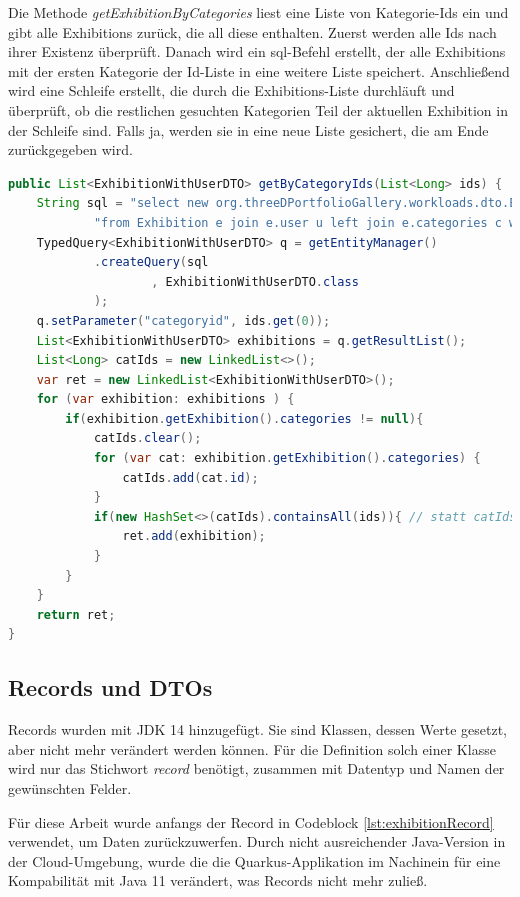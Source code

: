 Die Methode \emph{getExhibitionByCategories} liest eine Liste von Kategorie-Ids ein und gibt alle Exhibitions zurück, die all diese enthalten. 
Zuerst werden alle Ids nach ihrer Existenz überprüft. 
Danach wird ein \gls{sql}-Befehl erstellt, der alle Exhibitions mit der ersten Kategorie der Id-Liste in eine weitere Liste speichert. 
Anschließend wird eine Schleife erstellt, die durch die Exhibitions-Liste durchläuft und überprüft, ob die restlichen gesuchten Kategorien Teil der aktuellen Exhibition in der Schleife sind. 
Falls ja, werden sie in eine neue Liste gesichert, die am Ende zurückgegeben wird.

\begin{lstlisting}[label=lst:json:newExhibition, caption=Beispiel für neue Exhibition, language=Java]
public List<ExhibitionWithUserDTO> getByCategoryIds(List<Long> ids) {
    String sql = "select new org.threeDPortfolioGallery.workloads.dto.ExhibitionWithUserDTO(e, u.user_name, u.icon_url) " +
            "from Exhibition e join e.user u left join e.categories c where c.id in :categoryid";
    TypedQuery<ExhibitionWithUserDTO> q = getEntityManager()
            .createQuery(sql
                    , ExhibitionWithUserDTO.class
            );
    q.setParameter("categoryid", ids.get(0));
    List<ExhibitionWithUserDTO> exhibitions = q.getResultList();
    List<Long> catIds = new LinkedList<>();
    var ret = new LinkedList<ExhibitionWithUserDTO>();
    for (var exhibition: exhibitions ) {
        if(exhibition.getExhibition().categories != null){
            catIds.clear();
            for (var cat: exhibition.getExhibition().categories) {
                catIds.add(cat.id);
            }
            if(new HashSet<>(catIds).containsAll(ids)){ // statt catIds.containsAll(ids) wegen performance, ye
                ret.add(exhibition);
            }
        }
    }
    return ret;
}
\end{lstlisting}

\subsection{Records und DTOs}
Records wurden mit JDK 14 hinzugefügt. 
Sie sind Klassen, dessen Werte gesetzt, aber nicht mehr verändert werden können. 
Für die Definition solch einer Klasse wird nur das Stichwort \emph{record} benötigt, zusammen mit Datentyp und Namen der gewünschten Felder. \cite{recordAbout}

Für diese Arbeit wurde anfangs der Record in Codeblock \ref{lst:exhibitionRecord} verwendet, um Daten zurückzuwerfen. 
Durch nicht ausreichender Java-Version in der Cloud-Umgebung, wurde die die Quarkus-Applikation im Nachinein für eine Kompabilität mit Java 11 verändert, was Records nicht mehr zuließ. 


